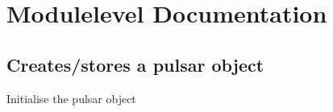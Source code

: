 \documentclass[letterpaper,10pt,english]{sphinxmanual}
\begin{document}
\chapter{Module\sphinxhyphen{}level Documentation}
\label{\detokenize{module-level-docs:module-level-documentation}}\label{\detokenize{module-level-docs:module-level-docs}}\label{\detokenize{module-level-docs::doc}}

\section{{\hyperref[\detokenize{module-level-docs:module-pulsar}]{}} \textendash{} Creates/stores a pulsar object}
\label{\detokenize{module-level-docs:module-pulsar}}\label{\detokenize{module-level-docs:pulsar-creates-stores-a-pulsar-object}}\label{\detokenize{module-level-docs:pulsar-module-docs}}

\begin{fulllineitems}
\label{\detokenize{module-level-docs:pulsar.Pulsar}}
\pysigstartsignatures
\pysigline
{}
\pysigstopsignatures
\end{fulllineitems}


\begin{fulllineitems}
\label{\detokenize{module-level-docs:pulsar.Pulsar.__init__}}
\pysigstartsignatures
\pysiglinewithargsret
{}
{}
{}
\pysigstopsignatures
\sphinxAtStartPar
Initialise the pulsar object

\end{fulllineitems}
\end{document}

